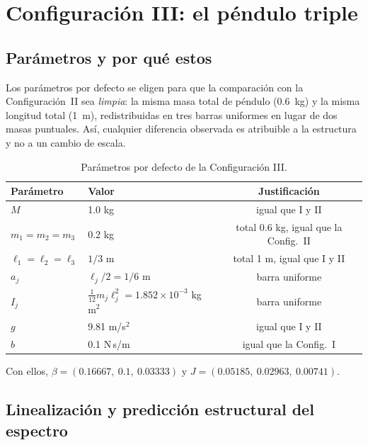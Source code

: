 \documentclass[11pt,letterpaper]{article}
\theoremstyle{definition}
\theoremstyle{plain}
\theoremstyle{remark}
\begin{document}
\section{Configuración III: el péndulo triple}
\label{sec:configiii}

\subsection{Parámetros y por qué estos}

Los parámetros por defecto se eligen para que la comparación con la
Configuración~II sea \emph{limpia}: la misma masa total de péndulo (0.6~kg) y la
misma longitud total (1~m), redistribuidas en tres barras uniformes en lugar de
dos masas puntuales. Así, cualquier diferencia observada es atribuible a la
estructura y no a un cambio de escala.

\begin{table}[htbp]
  \centering\small
  \caption{Parámetros por defecto de la Configuración III.}
  \label{tab:paramsiii}
  \begin{tabular}{@{}llc@{}}
    \toprule
    \textbf{Parámetro} & \textbf{Valor} & \textbf{Justificación}\\
    \midrule
    $M$ & 1.0 kg & igual que I y II\\
    $m_1=m_2=m_3$ & 0.2 kg & total 0.6 kg, igual que la Config.~II\\
    $\ell_1=\ell_2=\ell_3$ & $1/3$ m & total 1 m, igual que I y II\\
    $a_j$ & $\ell_j/2=1/6$ m & barra uniforme\\
    $I_j$ & $\tfrac{1}{12}m_j\ell_j^2=1.852\times10^{-3}$ kg\,m$^2$ & barra uniforme\\
    $g$ & 9.81 m/s$^2$ & igual que I y II\\
    $b$ & 0.1 N\,s/m & igual que la Config.~I\\
    \bottomrule
  \end{tabular}
\end{table}

Con ellos, $\beta=(0.16667,\ 0.1,\ 0.03333)$ y
$J=(0.05185,\ 0.02963,\ 0.00741)$.

\subsection{Linealización y predicción estructural del espectro}
\label{sec:linealizacion}
\end{document}
